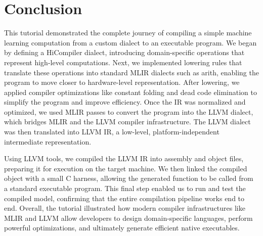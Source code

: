 \documentclass[../main.tex]{subfiles}
\begin{document}
\section{Conclusion}
    This tutorial demonstrated the complete journey of compiling a simple machine learning
computation from a custom dialect to an executable program. We began by defining a HiCompiler dialect,
introducing domain-specific operations that represent high-level computations.
Next, we implemented lowering rules that translate these operations into standard MLIR dialects
such as arith, enabling the program to move closer to hardware-level representation.
After lowering, we applied compiler optimizations like constant folding and dead code
elimination to simplify the program and improve efficiency. Once the IR was normalized
and optimized, we used MLIR passes to convert the program into the LLVM dialect,
which bridges MLIR and the LLVM compiler infrastructure. The LLVM dialect was then
translated into LLVM IR, a low-level, platform-independent intermediate representation.
    
    Using LLVM tools, we compiled the LLVM IR into assembly and object files, preparing
it for execution on the target machine. We then linked the compiled object with
a small C harness, allowing the generated function to be called from a standard executable
program. This final step enabled us to run and test the compiled model, confirming that
the entire compilation pipeline works end to end. Overall, the tutorial illustrated how
modern compiler infrastructures like MLIR and LLVM allow developers to design domain-specific
languages, perform powerful optimizations, and ultimately generate efficient native executables.
\end{document}
